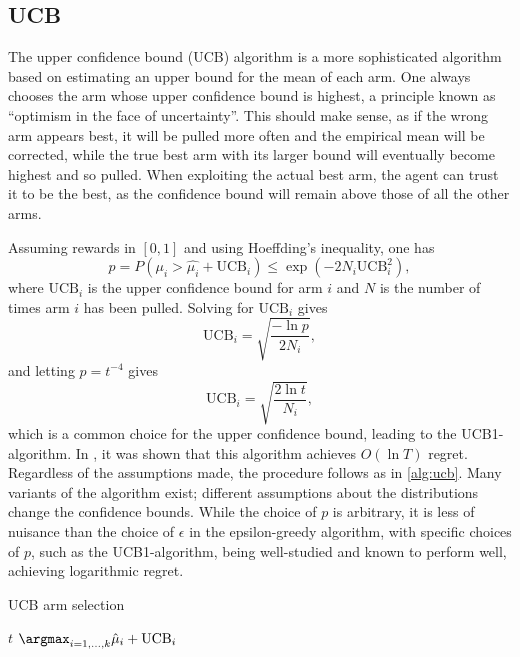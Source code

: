 \subsection{UCB}
The upper confidence bound (UCB) algorithm is a more sophisticated algorithm based on estimating an upper bound for the mean of each arm.
One always chooses the arm whose upper confidence bound is highest, a principle known as \enquote{optimism in the face of uncertainty}.
This should make sense, as if the wrong arm appears best, it will be pulled more often and the empirical mean will be corrected, while the true best arm with its larger bound will eventually become highest and so pulled.
When exploiting the actual best arm, the agent can trust it to be the best, as the confidence bound will remain above those of all the other arms.

Assuming rewards in $[0,1]$ and using Hoeffding's inequality, one has
\begin{equation}
    p
    = P \left(\mu_i > \hat{\mu_i} + \text{UCB}_i \right)
    \leq \exp \left(-2N_i \text{UCB}_i^2 \right),
\end{equation}
where $\text{UCB}_i$ is the upper confidence bound for arm $i$ and $N$ is the number of times arm $i$ has been pulled.
Solving for $\text{UCB}_i$ gives
\begin{equation}
    \text{UCB}_i = \sqrt{\frac{-\ln p}{2N_i}},
\end{equation}
and letting $p = t^{-4}$ gives
\begin{equation}
    \text{UCB}_i = \sqrt{\frac{2 \ln t}{N_i}},
\end{equation}
which is a common choice for the upper confidence bound, leading to the UCB1-algorithm.
In \cite{auer2002}, it was shown that this algorithm achieves $O(\ln T)$ regret.
Regardless of the assumptions made, the procedure follows as in \cref{alg:ucb}.
Many variants of the algorithm exist; different assumptions about the distributions change the confidence bounds.
While the choice of $p$ is arbitrary, it is less of nuisance than the choice of $\epsilon$ in the epsilon-greedy algorithm, with specific choices of $p$, such as the UCB1-algorithm, being well-studied and known to perform well, achieving logarithmic regret.

\begin{algorithm}
    \caption{UCB arm selection}
    \label{alg:ucb}
    \begin{algorithmic}
        \State \Return $t$
        \Else
        \State \Return $\argmax_{i=1,\dots,k} \hat{\mu}_i + \text{UCB}_i$
        \EndIf
    \end{algorithmic}
\end{algorithm}




